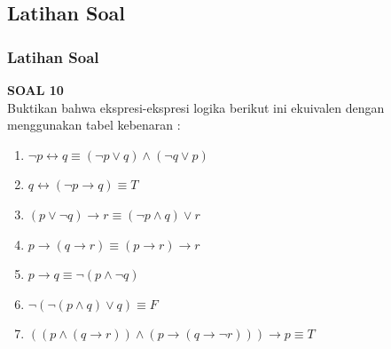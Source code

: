 \documentclass[handout]{beamer}
\theoremstyle{definition}
\theoremstyle{example}
\begin{document}
\subsection{Latihan Soal}
\begin{frame}
	\frametitle{Latihan Soal}
	\textbf{SOAL 10}\\
	Buktikan bahwa ekspresi-ekspresi logika berikut ini ekuivalen dengan menggunakan tabel kebenaran :\\
	\begin{enumerate}
		\item $ \neg p \leftrightarrow q  \equiv (\neg p \vee q)\wedge (\neg q \vee p) $
		\item $q \leftrightarrow (\neg p \rightarrow q) \equiv T$
		\item $(p \vee \neg q)\rightarrow r \equiv (\neg p \wedge q)\vee r$	
		\item $p \rightarrow (q \rightarrow r) \equiv (p \rightarrow r)\rightarrow r$
		\item $p \rightarrow q \equiv \neg (p \wedge \neg q) $
		\item $\neg (\neg(p \wedge q)\vee q) \equiv F$
		\item $ ((p \wedge (q\rightarrow r))\wedge(p \rightarrow(q \rightarrow \neg r)))\rightarrow p \equiv T$	
	\end{enumerate}	
\end{frame}
\end{document}

